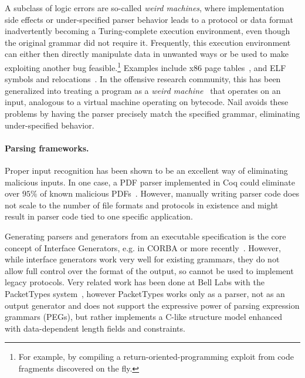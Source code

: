 A subclass of logic errors are so-called \textit{weird machines}, where
implementation side effects or under-specified parser behavior leads to a
protocol or data format inadvertently becoming a Turing-complete execution
environment, even though the original grammar did not require it.
Frequently, this execution environment can either
then directly manipulate data in unwanted ways or be used to make
exploiting another bug feasible.\footnote{For example, by compiling a
return-oriented-programming exploit from code fragments discovered on
the fly.} Examples include x86 page tables~\cite{bangert2013page}, and
ELF symbols and relocations~\cite{shapiro2013weird}. In the offensive
research community, this has been generalized into treating a program
as a \textit{weird machine}~\cite{bratus2011exploit} that operates on
an input, analogous to a virtual machine operating on bytecode.
Nail avoids these problems by having the parser precisely match the
specified grammar, eliminating under-specified behavior.


\paragraph{Parsing frameworks.}
Proper input recognition has  been shown to be an excellent way of
eliminating malicious inputs. In one case, a  PDF parser implemented in
Coq could eliminate over $95\%$ of known malicious PDFs~\cite{Bogk-PDF}.
However, manually writing parser code does not scale to the number of
file formats  and protocols in existence and might result in parser code
tied to one specific application.

Generating parsers and generators from an executable specification
is the core concept of Interface Generators, e.g. in CORBA or more
recently~\cite{varda2008}. However, while interface generators work
very well for existing grammars, they do not allow full control over the
format of the output, so cannot be used to implement legacy protocols.
Very related work has been done at Bell Labs with the PacketTypes
system~\cite{mccann2000packet}, however PacketTypes works only as a
parser, not as an output generator and does not support the expressive
power of parsing expression grammars (PEGs), but rather implements a
C-like structure model enhanced with data-dependent length fields and
constraints.

